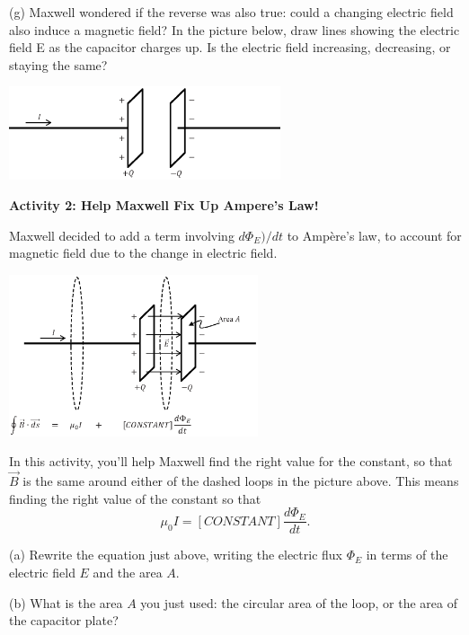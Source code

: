 (g) Maxwell wondered if the reverse was also true: could a changing electric field also induce a magnetic field?  In the picture below, draw lines showing the electric field E as the capacitor charges up.  Is the electric field  increasing, decreasing, or staying the same?
\begin{center}
\vspace{-0.2in}
    \includegraphics[width=0.6\textwidth]{deriving_em_waves/capacitor2.eps}
\end{center}

\pagebreak
\textbf{Activity 2: Help Maxwell Fix Up Ampere's Law!}

Maxwell decided to add a term involving $d\Phi_E)/dt$ to Amp\`ere's law, to account for magnetic field due to the change in electric field.
\begin{center}
\vspace{-0.2in}
    \includegraphics[width=0.55\textwidth]{deriving_em_waves/two_loops_with_equation.eps}
\vspace{-0.1in}
\end{center}

In this activity, you'll help Maxwell find the right value for the constant, so that $\vec B$ is the same around either of the dashed loops in the picture above.  This means finding the right value of the constant so that
\begin{displaymath}
\mu_0I = [CONSTANT] \frac{d\Phi_E}{dt}.
\end{displaymath}

(a) Rewrite the equation just above, writing the electric flux $\Phi_E$ in terms of the electric field $E$ and the area $A$.
\vspace{0.4in}

(b) What is the area $A$ you just used: the circular area of the loop, or the area of the capacitor plate?
\vspace{0.5in}

